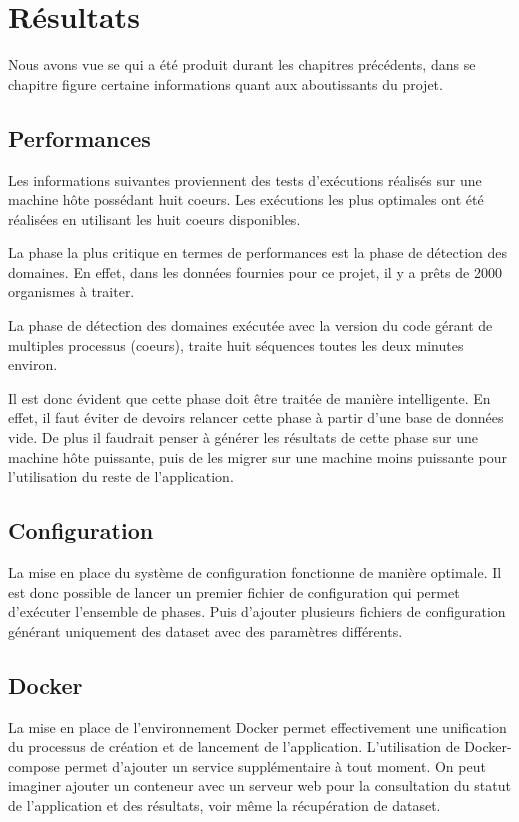 \chapter{Résultats}
\label{ch:result}

Nous avons vue se qui a été produit durant les chapitres précédents, dans se chapitre figure certaine informations quant aux aboutissants du projet.

\section{Performances}
Les informations suivantes proviennent des tests d'exécutions réalisés sur une machine hôte possédant huit coeurs. Les exécutions les plus optimales ont été réalisées en utilisant les huit coeurs disponibles. 

La phase la plus critique en termes de performances est la phase de détection des domaines. En effet, dans les données fournies pour ce projet, il y a prêts de 2000 organismes à traiter.

La phase de détection des domaines exécutée avec la version du code gérant de multiples processus (coeurs), traite huit séquences toutes les deux minutes environ.

Il est donc évident que cette phase doit être traitée de manière intelligente. En effet, il faut éviter de devoirs relancer cette phase à partir d'une base de données vide. De plus il faudrait penser à générer les résultats de cette phase sur une machine hôte puissante, puis de les migrer sur une machine moins puissante pour l'utilisation du reste de l'application.

\section{Configuration}
La mise en place du système de configuration fonctionne de manière optimale. Il est donc possible de lancer un premier fichier de configuration qui permet d'exécuter l'ensemble de phases. Puis d'ajouter plusieurs fichiers de configuration générant uniquement des dataset avec des paramètres différents.

\section{Docker}
La mise en place de l'environnement Docker permet effectivement une unification du processus de création et de lancement de l'application. L'utilisation de Docker-compose permet d'ajouter un service supplémentaire à tout moment. On peut imaginer ajouter un conteneur avec un serveur web pour la consultation du statut de l'application et des résultats, voir même la récupération de dataset.













